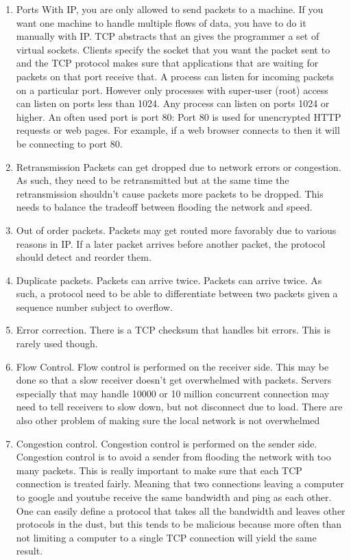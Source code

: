 \begin{enumerate}
  \item \gls{Ports}
  With IP, you are only allowed to send packets to a machine.
  If you want one machine to handle multiple flows of data, you have to do it manually with IP.
  TCP abstracts that an gives the programmer a set of virtual sockets.
  Clients specify the socket that you want the packet sent to and the TCP protocol makes sure that applications that are waiting for packets on that port receive that.
  A process can listen for incoming packets on a particular port.
  However only processes with \gls{super-user} (root) access can listen on ports less than 1024.
  Any process can listen on ports 1024 or higher.
  An often used port is port 80: Port 80 is used for unencrypted HTTP requests or web pages.
  For example, if a web browser connects to  then it will be connecting to port 80.

\item \gls{Retransmission}
  Packets can get dropped due to network errors or congestion.
  As such, they need to be retransmitted but at the same time the retransmission shouldn't cause packets more packets to be dropped.
  This needs to balance the tradeoff between flooding the network and speed.

\item Out of order packets.
  Packets may get routed more favorably due to various reasons in IP.
  If a later packet arrives before another packet, the protocol should detect and reorder them.

\item Duplicate packets.
  Packets can arrive twice.
  Packets can arrive twice.
  As such, a protocol need to be able to differentiate between two packets given a sequence number subject to overflow.

\item Error correction.
  There is a TCP checksum that handles bit errors.
  This is rarely used though.

\item Flow Control.
  Flow control is performed on the receiver side.
  This may be done so that a slow receiver doesn't get overwhelmed with packets.
  Servers especially that may handle 10000 or 10 million concurrent connection may need to tell receivers to slow down, but not disconnect due to load.
  There are also other problem of making sure the local network is not overwhelmed

\item Congestion control.
  Congestion control is performed on the sender side.
  Congestion control is to avoid a sender from flooding the network with too many packets.
  This is really important to make sure that each TCP connection is treated fairly.
  Meaning that two connections leaving a computer to google and youtube receive the same bandwidth and ping as each other.
  One can easily define a protocol that takes all the bandwidth and leaves other protocols in the dust, but this tends to be malicious because more often than not limiting a computer to a single TCP connection will yield the same result.


\end{enumerate}
